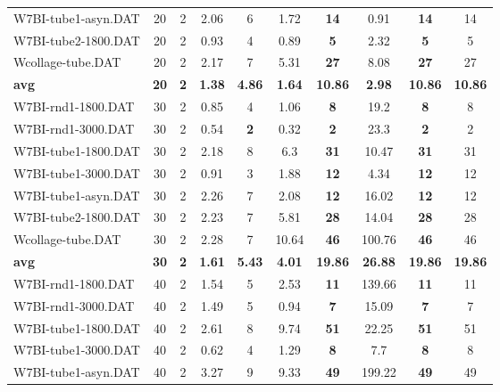 \begin{table}[h]
\begin{tabular}{lccccccccc}
W7BI-tube1-asyn.DAT & 20 & 2 & 2.06 & 6 & 1.72 &  \textbf{14} &  \textcolor{blue2}{0.91} &  \textbf{14}  & 14 \\
W7BI-tube2-1800.DAT & 20 & 2 & 0.93 & 4 &  \textcolor{blue2}{0.89} &  \textbf{5} & 2.32 &  \textbf{5}  & 5 \\
Wcollage-tube.DAT & 20 & 2 &  \textcolor{blue2}{2.17} & 7 & 5.31 &  \textbf{27} & 8.08 &  \textbf{27}  & 27 \\
\cline{1-10} \textbf{avg} & \textbf{20} & \textbf{2} & \textbf{1.38} & \textbf{4.86} & \textbf{1.64} & \textbf{10.86} & \textbf{2.98} & \textbf{10.86} & \textbf{10.86} \\ \cline{1-10}
W7BI-rnd1-1800.DAT & 30 & 2 &  \textcolor{blue2}{0.85} & 4 & 1.06 &  \textbf{8} & 19.2 &  \textbf{8}  & 8 \\
W7BI-rnd1-3000.DAT & 30 & 2 & 0.54 &  \textbf{2} &  \textcolor{blue2}{0.32} &  \textbf{2} & 23.3 &  \textbf{2}  & 2 \\
W7BI-tube1-1800.DAT & 30 & 2 &  \textcolor{blue2}{2.18} & 8 & 6.3 &  \textbf{31} & 10.47 &  \textbf{31}  & 31 \\
W7BI-tube1-3000.DAT & 30 & 2 &  \textcolor{blue2}{0.91} & 3 & 1.88 &  \textbf{12} & 4.34 &  \textbf{12}  & 12 \\
W7BI-tube1-asyn.DAT & 30 & 2 & 2.26 & 7 &  \textcolor{blue2}{2.08} &  \textbf{12} & 16.02 &  \textbf{12}  & 12 \\
W7BI-tube2-1800.DAT & 30 & 2 &  \textcolor{blue2}{2.23} & 7 & 5.81 &  \textbf{28} & 14.04 &  \textbf{28}  & 28 \\
Wcollage-tube.DAT & 30 & 2 &  \textcolor{blue2}{2.28} & 7 & 10.64 &  \textbf{46} & 100.76 &  \textbf{46}  & 46 \\
\cline{1-10} \textbf{avg} & \textbf{30} & \textbf{2} & \textbf{1.61} & \textbf{5.43} & \textbf{4.01} & \textbf{19.86} & \textbf{26.88} & \textbf{19.86} & \textbf{19.86} \\ \cline{1-10}
W7BI-rnd1-1800.DAT & 40 & 2 &  \textcolor{blue2}{1.54} & 5 & 2.53 &  \textbf{11} & 139.66 &  \textbf{11}  & 11 \\
W7BI-rnd1-3000.DAT & 40 & 2 & 1.49 & 5 &  \textcolor{blue2}{0.94} &  \textbf{7} & 15.09 &  \textbf{7}  & 7 \\
W7BI-tube1-1800.DAT & 40 & 2 &  \textcolor{blue2}{2.61} & 8 & 9.74 &  \textbf{51} & 22.25 &  \textbf{51}  & 51 \\
W7BI-tube1-3000.DAT & 40 & 2 &  \textcolor{blue2}{0.62} & 4 & 1.29 &  \textbf{8} & 7.7 &  \textbf{8}  & 8 \\
W7BI-tube1-asyn.DAT & 40 & 2 &  \textcolor{blue2}{3.27} & 9 & 9.33 &  \textbf{49} & 199.22 &  \textbf{49}  & 49 \\

\end{tabular}
\end{table}
